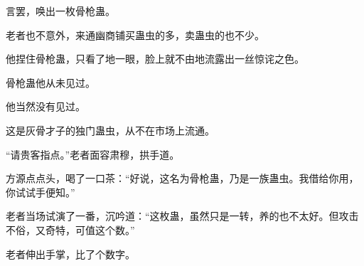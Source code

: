 \begin{this_body}
言罢，唤出一枚骨枪蛊。

老者也不意外，来通幽商铺买蛊虫的多，卖蛊虫的也不少。

他捏住骨枪蛊，只看了地一眼，脸上就不由地流露出一丝惊诧之色。

骨枪蛊他从未见过。

他当然没有见过。

这是灰骨才子的独门蛊虫，从不在市场上流通。

“请贵客指点。”老者面容肃穆，拱手道。

方源点点头，喝了一口茶：“好说，这名为骨枪蛊，乃是一族蛊虫。我借给你用，你试试手便知。”

老者当场试演了一番，沉吟道：“这枚蛊，虽然只是一转，养的也不太好。但攻击不俗，又奇特，可值这个数。”

老者伸出手掌，比了个数字。

\end{this_body}

